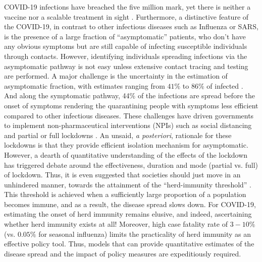 \documentclass[aps,prl,reprint,superscriptaddress]{revtex4-1}
\begin{document}
COVID-19 infections have breached the five million mark, yet there is neither a vaccine nor a scalable treatment in sight \cite{chan2020familial,enserink2020mathematics}. Furthermore, a distinctive feature of the COVID-19, in contrast to other infectious diseases such as Influenza or SARS, is the presence of a large fraction of ``asymptomatic'' patients, who don't have any obvious symptoms but are still capable of infecting susceptible individuals through contacts. However, identifying individuals spreading infections via  the asymptomatic pathway is not easy unless extensive contact tracing and testing are performed. A major challenge is the uncertainty in the estimation of asymptomatic fraction, with estimates ranging from  $41\%$ to $86\%$ of infected \cite{asymptomatic,nishiura2020estimation}.  And along the symptomatic pathway, 44\% of the infections are spread before the onset of symptoms rendering the quarantining people with symptoms less efficient compared to other infectious diseases.\cite{he2020temporal} These challenges have driven governments to implement non-pharmaceutical interventions (NPIs) such as social distancing and partial or full lockdowns \cite{ferguson2020impact}.  An unsaid, \emph{a posteriori}, rationale for these lockdowns is that they provide efficient isolation mechanism for asymptomatic. However, a dearth of quantitative understanding of the effects of the lockdown has triggered debate around the effectiveness, duration and mode (partial vs. full) of lockdown. Thus, it is even suggested that societies should just move in an unhindered manner, towards the attainment of the ``herd-immunity threshold'' \cite{UK-herd}. This threshold is achieved when a sufficiently large proportion of a population becomes immune, and as a result, the disease spread slows down. For COVID-19, estimating the onset of herd immunity remains elusive, and indeed, ascertaining whether herd immunity exists at all! Moreover, high case fatality rate of $3-10\%$ (vs. $0.05\%$ for seasonal influenza) limits the practicality of herd immunity as an effective policy tool. Thus, models that can provide quantitative estimates of the disease spread and the impact of policy measures are expeditiously required.
\end{document}
